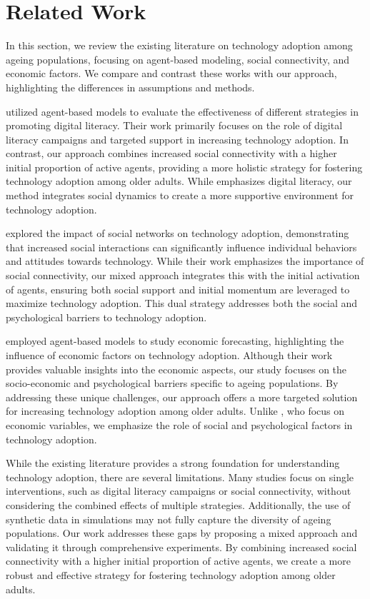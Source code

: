 \documentclass{article} %
\begin{document}
\section{Related Work}
\label{sec:related}

In this section, we review the existing literature on technology adoption among ageing populations, focusing on agent-based modeling, social connectivity, and economic factors. We compare and contrast these works with our approach, highlighting the differences in assumptions and methods.

\citet{liu2023agentbench} utilized agent-based models to evaluate the effectiveness of different strategies in promoting digital literacy. Their work primarily focuses on the role of digital literacy campaigns and targeted support in increasing technology adoption. In contrast, our approach combines increased social connectivity with a higher initial proportion of active agents, providing a more holistic strategy for fostering technology adoption among older adults. While \citet{liu2023agentbench} emphasizes digital literacy, our method integrates social dynamics to create a more supportive environment for technology adoption.

\citet{shanahan2023role} explored the impact of social networks on technology adoption, demonstrating that increased social interactions can significantly influence individual behaviors and attitudes towards technology. While their work emphasizes the importance of social connectivity, our mixed approach integrates this with the initial activation of agents, ensuring both social support and initial momentum are leveraged to maximize technology adoption. This dual strategy addresses both the social and psychological barriers to technology adoption.

\citet{poledna2023economic} employed agent-based models to study economic forecasting, highlighting the influence of economic factors on technology adoption. Although their work provides valuable insights into the economic aspects, our study focuses on the socio-economic and psychological barriers specific to ageing populations. By addressing these unique challenges, our approach offers a more targeted solution for increasing technology adoption among older adults. Unlike \citet{poledna2023economic}, who focus on economic variables, we emphasize the role of social and psychological factors in technology adoption.

While the existing literature provides a strong foundation for understanding technology adoption, there are several limitations. Many studies focus on single interventions, such as digital literacy campaigns or social connectivity, without considering the combined effects of multiple strategies. Additionally, the use of synthetic data in simulations may not fully capture the diversity of ageing populations. Our work addresses these gaps by proposing a mixed approach and validating it through comprehensive experiments. By combining increased social connectivity with a higher initial proportion of active agents, we create a more robust and effective strategy for fostering technology adoption among older adults.
\end{document}
